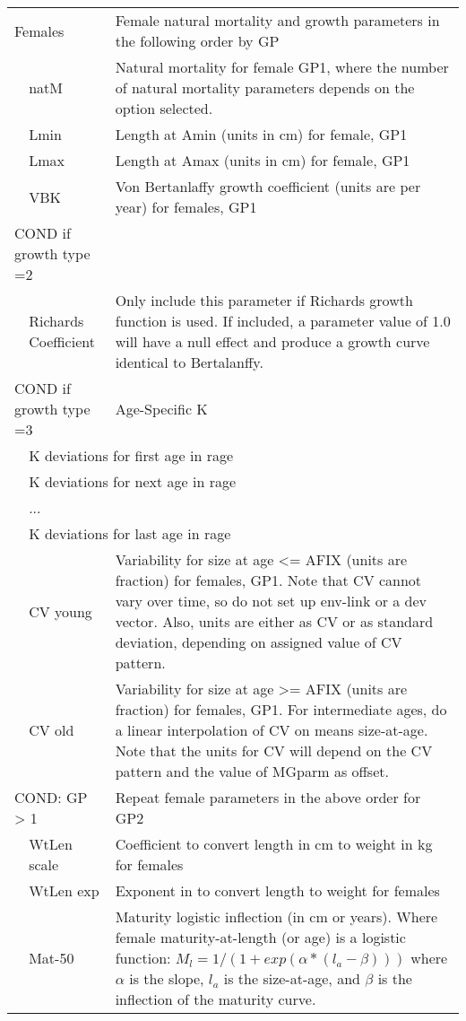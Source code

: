 \begin{center}
\begin{longtable}{p{1cm} p{2.5cm} p{10cm}}
		\multicolumn{2}{l}{Females} & Female natural mortality and growth parameters in the following order by GP\\
		& natM & Natural mortality for female GP1, where the number of natural mortality parameters depends on the option selected.\\
		& Lmin & Length at Amin (units in cm) for female, GP1 \\
		& Lmax & Length at Amax (units in cm) for female, GP1 \\
		& VBK & Von Bertanlaffy growth coefficient (units are per year) for females, GP1\\
		\hline
		\multicolumn{2}{l}{COND if growth type =2 } & \\
		& Richards Coefficient & Only include this parameter if Richards growth function is used.  If included, a parameter value of 1.0 will have a null effect and produce a growth curve identical to Bertalanffy.\\
		\multicolumn{2}{l}{COND if growth type =3 } & Age-Specific K \\
		& \multicolumn{2}{l}{K deviations for first age in rage}\\
		& \multicolumn{2}{l}{K deviations for next age in rage}\\
		& ... & \\
		& \multicolumn{2}{l}{K deviations for last age in rage}\\
		\hline
	    & CV young & Variability for size at age <= AFIX (units are fraction) for females, GP1.  Note that CV cannot vary over time, so do not set up env-link or a dev vector.  Also, units are either as CV or as standard deviation, depending on assigned value of CV pattern.\\
		& CV old & Variability for size at age >= AFIX (units are fraction) for females, GP1. For intermediate ages, do a linear interpolation of CV on means size-at-age.  Note that the units for CV will depend on the CV pattern and the value of MGparm as offset.\\
		\hline
		\multicolumn{2}{l}{COND: GP > 1} & Repeat female parameters in the above order for GP2\\
		\hline
		& WtLen scale & Coefficient to convert length in cm to weight in kg for females\\
		& WtLen exp & Exponent in to convert length to weight for females\\
		& Mat-50 & Maturity logistic inflection (in cm or years).  Where female maturity-at-length (or age) is a logistic function: $M_{l} = 1/(1+exp(\alpha*(l_{a} - \beta)))$ where $\alpha$ is the slope, $l_{a}$ is the size-at-age, and $\beta$ is the inflection of the maturity curve. \\ 

\end{longtable}
\end{center}
